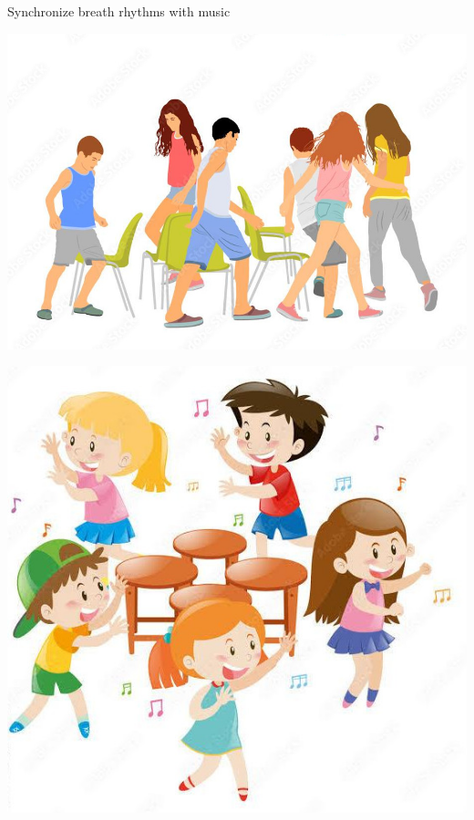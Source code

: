 \documentclass[makeidx, 11pt, oneside, onecolumn, openright, final, svgnames, dvipsnames, extrafontsizes]{memoir}
\begin{document}
\begin{center}
Synchronize breath rhythms with music 
\end{center}

\begin{center}
\includegraphics[scale=1.0]{musical.jpeg}

\includegraphics[scale=1.0]{musical2.jpeg}
\end{center}
\end{document}
